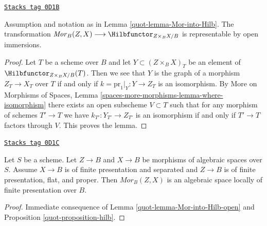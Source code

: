 \begin{lemma}
\label{quot-lemma-Mor-into-Hilb-open}
\href{https://stacks.math.columbia.edu/tag/0D1B}{\texttt{Stacks tag 0D1B}}

Assumption and notation as in Lemma \ref{quot-lemma-Mor-into-Hilb}.
The transformation
$\mathit{Mor}_B(Z, X) \longrightarrow \Hilbfunctor_{Z \times_B X/B}$
is representable by open immersions.
\end{lemma}

\begin{proof}
Let $T$ be a scheme over $B$ and let $Y \subset (Z \times_B X)_T$
be an element of $\Hilbfunctor_{Z \times_B X/B}(T)$. Then we see that
$Y$ is the graph of a morphism $Z_T \to X_T$ over $T$ if and only
if $k = \text{pr}_1|_Y : Y \to Z_T$ is an isomorphism. By
More on Morphisms of Spaces, Lemma
\ref{spaces-more-morphisms-lemma-where-isomorphism}
there exists an open subscheme $V \subset T$ such that
for any morphism of schemes $T' \to T$ we have
$k_{T'} : Y_{T'} \to Z_{T'}$ is an isomorphism if and
only if $T' \to T$ factors through $V$.
This proves the lemma.
\end{proof}

\begin{proposition}[Mor]
\label{quot-proposition-Mor}
\href{https://stacks.math.columbia.edu/tag/0D1C}{\texttt{Stacks tag 0D1C}}

Let $S$ be a scheme. Let $Z \to B$ and $X \to B$ be morphisms of algebraic
spaces over $S$. Assume $X \to B$ is of finite presentation and separated and
$Z \to B$ is of finite presentation, flat, and proper. Then
$\mathit{Mor}_B(Z, X)$ is an algebraic space locally of finite
presentation over $B$.
\end{proposition}

\begin{proof}

Immediate consequence of
Lemma \ref{quot-lemma-Mor-into-Hilb-open}
and Proposition \ref{quot-proposition-hilb}.
\end{proof}


